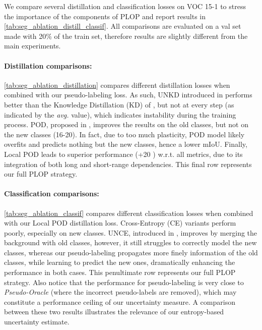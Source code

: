 We compare several distillation and classification losses on VOC 15-1 to stress the importance of
the components of PLOP and report results in \autoref{tab:seg_ablation_distill_classif}. All
comparisons are evaluated on a val set made with 20\% of the train set, therefore results are
slightly different from the main experiments.

\paragraph{Distillation comparisons:\,}\autoref{tab:seg_ablation_distillation} compares
different distillation losses when combined with our pseudo-labeling loss. As such, UNKD introduced
in \cite{cermelli2020modelingthebackground} performs better than the Knowledge Distillation (KD) of
\cite{hinton2015knowledge_distillation}, but not at every step (as indicated by the \textit{avg.}
value), which indicates instability during the training process. POD, proposed in
\cite{douillard2020podnet}, improves the results on the old classes, but not on the new classes
(16-20). In fact, due to too much plasticity, POD model likely overfits and predicts nothing but the
new classes, hence a lower \ac{mIoU}.  Finally, Local POD leads to superior performance (+20 \pp)
w.r.t. all metrics, due to its integration of both long and short-range dependencies. This final row
represents our full PLOP strategy.


\paragraph{Classification comparisons:\,}\autoref{tab:seg_ablation_classif} compares different
classification losses when combined with our Local POD distillation loss. Cross-Entropy (CE)
variants perform poorly, especially on new classes. UNCE, introduced in
\cite{cermelli2020modelingthebackground}, improves by merging the background with old classes,
however, it still struggles to correctly model the new classes, whereas our pseudo-labeling
propagates more finely information of the old classes, while learning to predict the new ones,
dramatically enhancing the performance in both cases. This penultimate row represents our full PLOP
strategy. Also notice that the performance for pseudo-labeling is very close to
\textit{Pseudo-Oracle} (where the incorrect pseudo-labels are removed), which may constitute a
performance ceiling of our uncertainty measure. A comparison between these two results illustrates
the relevance of our entropy-based uncertainty estimate.

